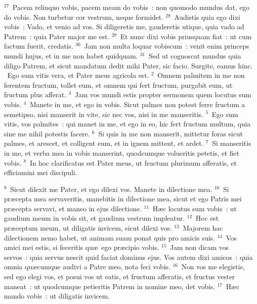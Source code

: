 ${}^{27}$~Pacem relinquo vobis, pacem meam do vobis~: non quomodo mundus dat, ego do vobis. Non turbetur cor vestrum, neque formidet.
${}^{28}$~Audistis quia ego dixi vobis~: Vado, et venio ad vos. Si diligeretis me, gauderetis utique, quia vado ad Patrem~: quia Pater major me est.
${}^{29}$~Et nunc dixi vobis priusquam fiat~: ut cum factum fuerit, credatis.
${}^{30}$~Jam non multa loquar vobiscum~: venit enim princeps mundi hujus, et in me non habet quidquam.
${}^{31}$~Sed ut cognoscat mundus quia diligo Patrem, et sicut mandatum dedit mihi Pater, sic facio. Surgite, eamus hinc.
~Ego sum vitis vera, et Pater meus agricola est.
${}^{2}$~Omnem palmitem in me non ferentem fructum, tollet eum, et omnem qui fert fructum, purgabit eum, ut fructum plus afferat.
${}^{3}$~Jam vos mundi estis propter sermonem quem locutus sum vobis.
${}^{4}$~Manete in me, et ego in vobis. Sicut palmes non potest ferre fructum a semetipso, nisi manserit in vite, sic nec vos, nisi in me manseritis.
${}^{5}$~Ego sum vitis, vos palmites~: qui manet in me, et ego in eo, hic fert fructum multum, quia sine me nihil potestis facere.
${}^{6}$~Si quis in me non manserit, mittetur foras sicut palmes, et arescet, et colligent eum, et in ignem mittent, et ardet.
${}^{7}$~Si manseritis in me, et verba mea in vobis manserint, quodcumque volueritis petetis, et fiet vobis.
${}^{8}$~In hoc clarificatus est Pater meus, ut fructum plurimum afferatis, et efficiamini mei discipuli.


${}^{9}$~Sicut dilexit me Pater, et ego dilexi vos. Manete in dilectione mea.
${}^{10}$~Si pr\ae cepta mea servaveritis, manebitis in dilectione mea, sicut et ego Patris mei pr\ae cepta servavi, et maneo in ejus dilectione.
${}^{11}$~H\ae c locutus sum vobis~: ut gaudium meum in vobis sit, et gaudium vestrum impleatur.
${}^{12}$~Hoc est pr\ae ceptum meum, ut diligatis invicem, sicut dilexi vos.
${}^{13}$~Majorem hac dilectionem nemo habet, ut animam suam ponat quis pro amicis suis.
${}^{14}$~Vos amici mei estis, si feceritis qu\ae\ ego pr\ae cipio vobis.
${}^{15}$~Jam non dicam vos servos~: quia servus nescit quid faciat dominus ejus. Vos autem dixi amicos~: quia omnia qu\ae cumque audivi a Patre meo, nota feci vobis.
${}^{16}$~Non vos me elegistis, sed ego elegi vos, et posui vos ut eatis, et fructum afferatis, et fructus vester maneat~: ut quodcumque petieritis Patrem in nomine meo, det vobis.
${}^{17}$~H\ae c mando vobis~: ut diligatis invicem.


